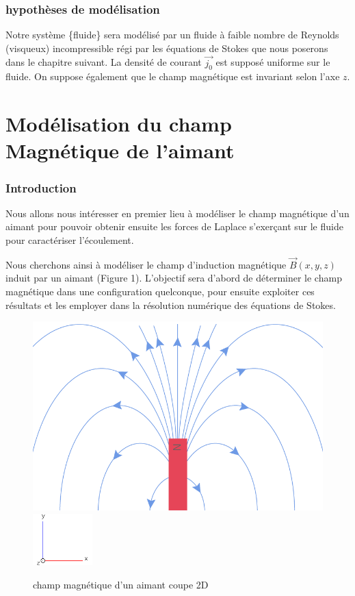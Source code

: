 \documentclass[a4paper,12pt,titlepage]{report}
\begin{document}
\begin{onehalfspace}
\subsection{hypothèses de modélisation}

Notre système \{fluide\} sera modélisé par un fluide à faible nombre de Reynolds (visqueux) incompressible régi par les équations de Stokes que nous poserons dans le chapitre suivant. La densité de courant $\vec{j_0}$ est supposé uniforme sur le fluide. On suppose également que le champ magnétique est invariant selon l'axe $z$.


\newpage
\chapter{Modélisation du champ Magnétique de l'aimant}
\subsection{Introduction}
Nous allons nous intéresser en premier lieu à modéliser le champ magnétique d'un aimant pour pouvoir obtenir ensuite les forces de Laplace s'exerçant sur le fluide pour caractériser l'écoulement.

Nous cherchons ainsi à modéliser le champ d'induction magnétique $\vec{B}(x,y,z)$ induit par un aimant (Figure 1). L'objectif sera d'abord de déterminer le champ magnétique dans une configuration quelconque, pour ensuite exploiter ces résultats et les employer dans la résolution numérique des équations de Stokes. \\
\begin{figure}[h]
\begin{center}
\includegraphics[height =4 cm, keepaspectratio]{graphes/champ_aimant1.png} %
\includegraphics[height = 2cm, keepaspectratio]{graphes/axes.png}
\caption{champ magnétique d'un aimant coupe 2D}
\label{figure 1}
\end{center}
\end{figure}


\end{onehalfspace}
\end{document}
